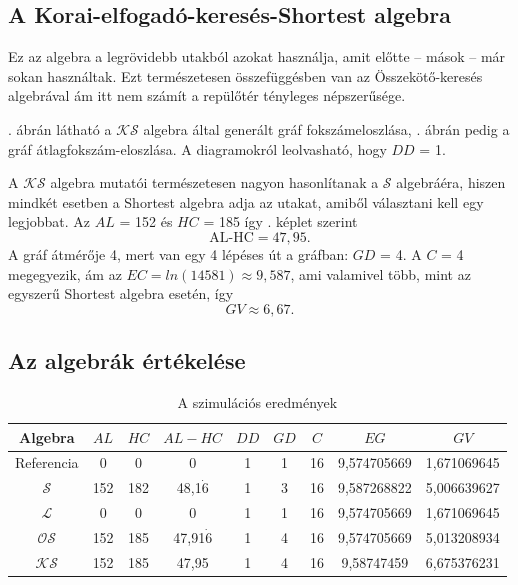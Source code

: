     \subsection{A Korai-elfogadó-keresés-Shortest algebra}
    Ez az algebra a legrövidebb utakból azokat használja, amit előtte -- mások -- már sokan használtak. Ezt természetesen összefüggésben van az Összekötő-keresés algebrával ám itt nem számít a repülőtér tényleges népszerűsége.

    . ábrán látható a $\mathcal{KS}$ algebra által generált gráf fokszámeloszlása, . ábrán pedig a gráf átlagfokszám-eloszlása. A diagramokról leolvasható, hogy $DD$ = 1.

    A $\mathcal{KS}$ algebra mutatói természetesen nagyon hasonlítanak a $\mathcal{S}$ algebráéra, hiszen mindkét esetben a Shortest algebra adja az utakat, amiből választani kell egy legjobbat. Az $AL$ = 152 és $HC$ = 185 így . képlet szerint $$\text{AL-HC} = 47,95.$$
    A gráf átmérője 4, mert van egy 4 lépéses út a gráfban: $GD$ = 4. A $C$ = 4 megegyezik, ám az $EC=ln(14581) \approx 9,587$, ami valamivel több, mint az egyszerű Shortest algebra esetén, így $$GV \approx 6,67.$$
    \newpage

    \subsection{Az algebrák értékelése}
    \renewcommand{\arraystretch}{1.2}
    \begin{table}[ht]
      \centering
        \begin{tabular}{| c || c | c || c || c | c | c | c || c |}
        \hline
        \textbf{Algebra} & $AL$ & $HC$ & $AL-HC$ & $DD$ & $GD$ & $C$ & $EG$ & $GV$\\
        \hline
        Referencia & 0 & 0 & 0 & 1 & 1 & 16 & 9,574705669 & 1,671069645\\
        $\mathcal{S}$ & 152 & 182 & 48,1$\dot{6}$ & 1 & 3 & 16 & 9,587268822 & 5,006639627\\
        $\mathcal{L}$ & 0 & 0 & 0 & 1 & 1 & 16 & 9,574705669 & 1,671069645 \\
        $\mathcal{OS}$ & 152 & 185 & 47,91$\dot{6}$ & 1 & 4 & 16 & 9,574705669 & 5,013208934\\
        $\mathcal{KS}$ & 152 & 185 & 47,95 & 1 & 4 & 16 & 9,58747459 & 6,675376231\\
        \hline
        \end{tabular}
      \caption{A szimulációs eredmények}
      \label{tab:eredmenyek}
    \end{table}


